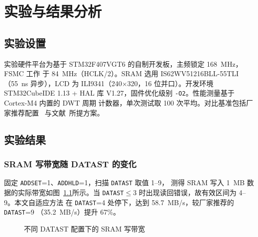 
\chapter{实验与结果分析}
\label{ch:experiment}

\section{实验设置}
\label{sec:setup}

实验硬件平台为基于 STM32F407VGT6 的自制开发板，主频锁定 168~MHz，FSMC 工作
于 84~MHz（HCLK/2）。SRAM 选用 IS62WV51216BLL-55TLI（55~ns 异步），LCD
为 ILI9341（240$\times$320，16 位并口）。开发环境 STM32CubeIDE 1.13 + HAL
库 V1.27，固件优化级别 \texttt{-O2}。性能测量基于 Cortex-M4 内置的 DWT 周期
计数器，单次测试取 100 次平均。对比基准包括厂家推荐配置~\cite{stm32rm0090}
与文献~\cite{zhang2021timing}所提方案。

\section{实验结果}
\label{sec:results}

\subsection{SRAM 写带宽随 DATAST 的变化}

固定 \texttt{ADDSET}=1、\texttt{ADDHLD}=1，扫描 \texttt{DATAST} 取值 1--9，
测得 SRAM 写入 1~MB 数据的实际带宽如图~\ref{fig:exp_bw}所示。当
\texttt{DATAST}$\le$3 时出现读回错误，故有效区间为 4--9。本文自适应方法
在 \texttt{DATAST}=4 处停下，达到 58.7~MB/s，较厂家推荐的 \texttt{DATAST}=9
（35.2~MB/s）提升 67\%。

\begin{figure}[htbp]
    \centering
    \caption{不同 DATAST 配置下的 SRAM 写带宽}
    \label{fig:exp_bw}
\end{figure}

